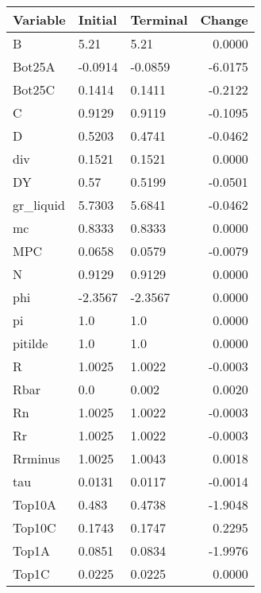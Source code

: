 \begin{table}
\centering
\label{tab:stst_comparison_low_beta_wedge_permanent}
\begin{tabular}{lllr}
\toprule
                Variable & Initial & Terminal &  Change \\
\midrule
                       B &    5.21 &     5.21 &  0.0000 \\
                  Bot25A & -0.0914 &  -0.0859 & -6.0175 \\
                  Bot25C &  0.1414 &   0.1411 & -0.2122 \\
                       C &  0.9129 &   0.9119 & -0.1095 \\
                       D &  0.5203 &   0.4741 & -0.0462 \\
                     div &  0.1521 &   0.1521 &  0.0000 \\
                      DY &    0.57 &   0.5199 & -0.0501 \\
               gr\_liquid &  5.7303 &   5.6841 & -0.0462 \\
                      mc &  0.8333 &   0.8333 &  0.0000 \\
                     MPC &  0.0658 &   0.0579 & -0.0079 \\
                       N &  0.9129 &   0.9129 &  0.0000 \\
                     phi & -2.3567 &  -2.3567 &  0.0000 \\
                      pi &     1.0 &      1.0 &  0.0000 \\
                 pitilde &     1.0 &      1.0 &  0.0000 \\
                       R &  1.0025 &   1.0022 & -0.0003 \\
                    Rbar &     0.0 &    0.002 &  0.0020 \\
                      Rn &  1.0025 &   1.0022 & -0.0003 \\
                      Rr &  1.0025 &   1.0022 & -0.0003 \\
                 Rrminus &  1.0025 &   1.0043 &  0.0018 \\
                     tau &  0.0131 &   0.0117 & -0.0014 \\
                  Top10A &   0.483 &   0.4738 & -1.9048 \\
                  Top10C &  0.1743 &   0.1747 &  0.2295 \\
                   Top1A &  0.0851 &   0.0834 & -1.9976 \\
                   Top1C &  0.0225 &   0.0225 &  0.0000 \\

\end{tabular}
\end{table}
